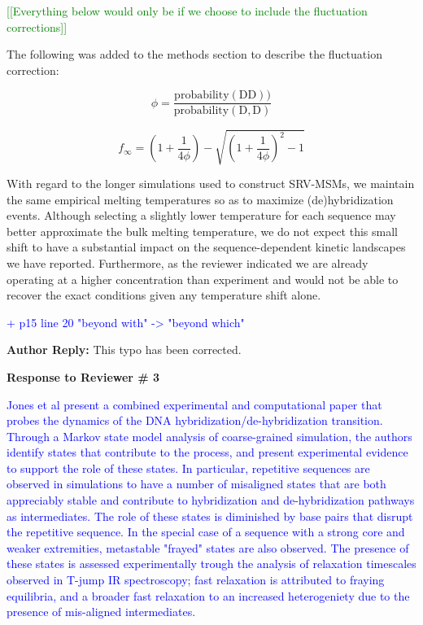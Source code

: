 \documentclass[11pt,a4paper]{letter} %
\newcommand*{\rood}[1]{{\color{red}{#1}}}
\newcommand*{\noteg}[1]{\textcolor{green}{[[#1]]}}		%
\begin{document}
\noteg{Everything below would only be if we choose to include the fluctuation corrections}

The following was added to the methods section to describe the fluctuation correction:

\rood{The following calculates the dimer fraction in bulk solution from simulations performed in a periodic box. We apply this to the dissociation fraction in order to better compare with the experimental slow response. We compute these values from the dimer fraction (DD) and monomer fraction (D, D).}

    \begin{equation}\label{}
    \phi = \frac{\mathrm{probability (DD))}}{\mathrm{probability (D, D)}}
    \end{equation}
    
    \begin{equation}\label{}
	f_{\infty} = (1+\frac{1}{4\phi}) - \sqrt{(1+\frac{1}{4\phi})^2 - 1}
	\end{equation}

With regard to the longer simulations used to construct SRV-MSMs, we maintain the same empirical melting temperatures so as to maximize (de)hybridization events. Although selecting a slightly lower temperature for each sequence may better approximate the bulk melting temperature, we do not expect this small shift to have a substantial impact on the sequence-dependent kinetic landscapes we have reported. Furthermore, as the reviewer indicated we are already operating at a higher concentration than experiment and would not be able to recover the exact conditions given any temperature shift alone.

\textcolor{blue}{+ p15 line 20 "beyond with" -> "beyond which"}

\textbf{Author Reply:}    This typo has been corrected.

\begin{shaded}
\textbf{Response to Reviewer \# 3}
\end{shaded}

\textcolor{blue}{Jones et al present a combined experimental and computational paper that probes the dynamics of the DNA hybridization/de-hybridization transition. Through a Markov state model analysis of coarse-grained simulation, the authors identify states that contribute to the process, and present experimental evidence to support the role of these states. In particular, repetitive sequences are observed in simulations to have a number of misaligned states that are both appreciably stable and contribute to hybridization and de-hybridization pathways as intermediates. The role of these states is diminished by base pairs that disrupt the repetitive sequence. In the special case of a sequence with a strong core and weaker extremities, metastable "frayed" states are also observed. The presence of these states is assessed experimentally trough the analysis of relaxation timescales observed in T-jump IR spectroscopy; fast relaxation is attributed to fraying equilibria, and a broader fast relaxation to an increased heterogeniety due to the presence of mis-aligned intermediates.}
\end{document}
